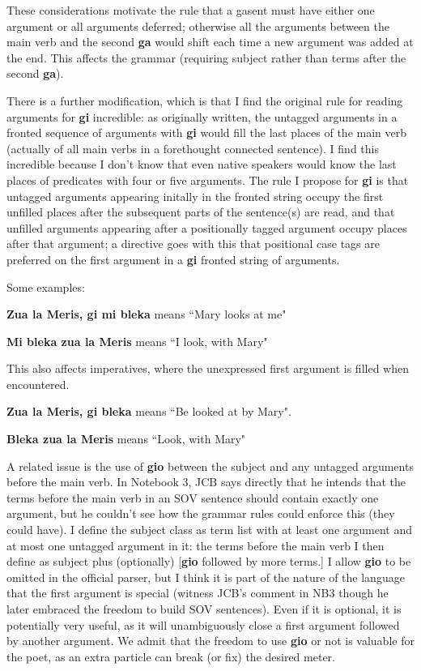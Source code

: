 \documentclass[12pt]{book}
\begin{document}
{These considerations motivate the rule that a gasent must have either one argument or all arguments deferred;
otherwise all the arguments between the main verb and the second {\bf ga} would shift each time a new argument was added at the end.  This affects the grammar (requiring subject rather than terms after the second {\bf ga}).

There is a further modification, which is that I find the original rule for reading arguments for {\bf gi} incredible:  as originally written, the untagged arguments in a fronted sequence of arguments with {\bf gi} would fill the last places of the main verb
(actually of all main verbs in a forethought connected sentence).  I find this incredible because I don't know that even native speakers would know the last places of predicates with four or five arguments.  The rule I propose for {\bf gi} is that  untagged arguments appearing initally in the fronted string occupy the first unfilled places after the subsequent parts of the sentence(s) are read, and that unfilled arguments appearing after a positionally tagged argument occupy places after that argument;  a directive goes with this that positional case tags are preferred on the first argument in a {\bf gi} fronted string of arguments.

Some examples:

{\bf Zua la Meris, gi mi bleka} means ``Mary looks at me"

{\bf Mi bleka zua la Meris} means ``I look, with Mary"

This also affects imperatives, where the unexpressed first argument is filled when encountered.

{\bf Zua la Meris, gi bleka} means ``Be looked at by Mary".

{\bf Bleka zua la Meris} means ``Look, with Mary"

A related issue is the use of {\bf gio} between the subject and any untagged arguments before the main verb.  In Notebook 3, JCB says directly that he intends that the terms before the main verb in an SOV sentence should contain exactly one argument, but he couldn't see how the grammar rules could enforce this (they could have).  I define the subject class as term list with at least one argument and at most one untagged argument in it:  the terms before the main verb I then define as subject plus (optionally) [{\bf gio} followed by more terms.]   I allow {\bf gio} to be omitted in the official parser, but I think it is part of the nature of the language that the first argument is special (witness JCB's comment in NB3 though he later embraced the freedom to build SOV sentences).  Even if it is optional, it is potentially very useful, as it will unambiguously close a first argument followed by another argument.  We admit that the freedom to use {\bf gio} or not is valuable for the poet, as an extra particle can break (or fix) the desired meter.

}
\end{document}
